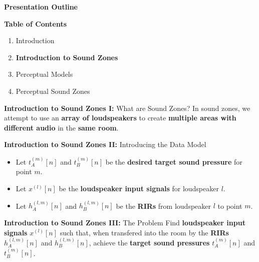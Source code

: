 \documentclass[aspectratio=169]{beamer}
\begin{document}
\begin{frame}{\textbf{Presentation Outline}}
    \begin{block}{\textbf{Table of Contents}}
        \begin{enumerate}
            \item Introduction
            \item \textbf{Introduction to Sound Zones}
            \item Perceptual Models 
            \item Perceptual Sound Zones
        \end{enumerate} 
    \end{block}
\end{frame}

\begin{frame}{\textbf{Introduction to Sound Zones I:} What are Sound Zones?}
    In sound zones, we attempt to use an \textbf{array of loudspeakers} to create \textbf{multiple areas with different audio} in the \textbf{same room}.
    \begin{figure}
        \centering
        \scalebox{0.6}{}
    \end{figure}
\end{frame}

\begin{frame}{\textbf{Introduction to Sound Zones II:} Introducing the Data Model}
    \begin{figure}
        \centering
        \scalebox{0.6}{}
    \end{figure}
    \begin{itemize}
        \item Let $t_A^{(m)}[n]$ and $t_B^{(m)}[n]$ be the \textbf{desired target sound pressure} for point $m$.
        \item Let $x^{(l)}[n]$ be the \textbf{loudspeaker input signals} for loudspeaker $l$.
        \item Let $h_A^{(l,m)}[n]$ and $h_B^{(l,m)}[n]$  be the \textbf{RIRs} from loudspeaker $l$ to point $m$.
    \end{itemize}
\end{frame}

\begin{frame}{\textbf{Introduction to Sound Zones III:} The Problem}
    Find \textbf{loudspeaker input signals} $x^{(l)}[n]$ such that, when transfered into the room by the \textbf{RIRs} $h_A^{(l,m)}[n]$ and $h_B^{(l,m)}[n]$, 
    achieve the \textbf{target sound pressures} $t_A^{(m)}[n]$ and $t_B^{(m)}[n]$.
    \begin{figure}
        \centering
        \scalebox{0.6}{}
    \end{figure}
\end{frame}
\end{document}
